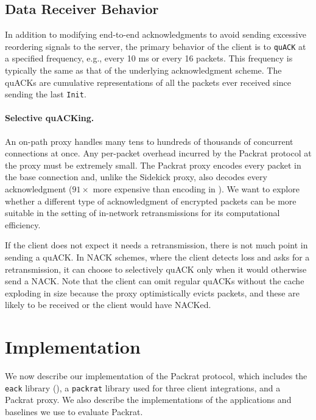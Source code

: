 \subsection{Data Receiver Behavior}

In addition to modifying end-to-end acknowledgments to avoid sending excessive
reordering signals to the server, the primary behavior of the client is
to \texttt{quACK} at a specified frequency, e.g., every 10 ms or every 16
packets. This frequency is typically the same as that of the underlying
acknowledgment scheme. The quACKs are cumulative representations of all the
packets ever received since sending the last \texttt{Init}.

\paragraph{Selective quACKing.}

An on-path proxy handles many tens to hundreds of thousands of concurrent
connections at once. Any per-packet overhead incurred by the Packrat protocol
at the proxy must be extremely small. The Packrat proxy encodes every packet in
the base connection and, unlike the Sidekick proxy, also decodes every
acknowledgment ($91\!\times$ more expensive than encoding in \cite
{yuan2024sidekick}). We want to explore whether a different type of
acknowledgment of encrypted packets can be more suitable in the setting of
in-network retransmissions for its computational efficiency.

If the client does not expect it needs a retransmission, there is not much point
in sending a quACK. In NACK schemes, where the client detects loss and asks for
a retransmission, it can choose to selectively quACK only when it would
otherwise send a NACK. Note that the client can omit regular quACKs without the
cache exploding in size because the proxy optimistically evicts packets, and
these are likely to be received or the client would have NACKed.\\

\section{Implementation}

We now describe our implementation of the Packrat protocol, which includes
the \texttt{eack} library (),
a \texttt{packrat} library used for three client integrations,
and a Packrat proxy. We also describe the implementations of the
applications and baselines we use to evaluate Packrat.

